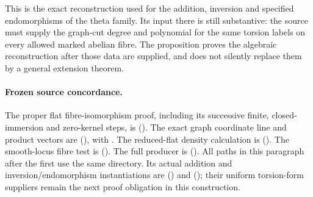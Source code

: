 This is the exact reconstruction used for the addition,
inversion and specified endomorphisms of the theta family.
Its input there is still substantive: the source must
supply the graph-cut degree and polynomial for the same
torsion labels on every allowed marked abelian fibre.
The proposition proves the algebraic reconstruction after
those data are supplied, and does not silently replace
them by a general extension theorem.

\paragraph{Frozen source concordance.}
The proper flat fibre-isomorphism proof, including its
successive finite, closed-immersion and zero-kernel steps,
is
().
The exact graph coordinate line and product vectors are
(),
with .
The reduced-flat density calculation is
().
The smooth-locus fibre test is
().
The full producer is
().
All paths in this paragraph after the first use the same
 directory.
Its actual addition and inversion/endomorphism
instantiations are
()
and 
();
their uniform torsion-form suppliers remain the next
proof obligation in this construction.
